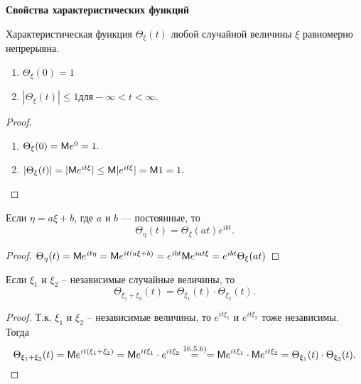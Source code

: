 \textbf{Свойства характеристических функций}

\begin{theorem}
\label{th:24.4}
	Характеристическая функция $\Theta_{\xi} (t)$ любой случайной величины $\xi$ равномерно непрерывна.
\end{theorem}

\begin{lemma}\-
\label{lemma:24.5}

\begin{enumerate}
	\item $\Theta_{\xi} (0) = 1$
	\item $|\Theta_{\xi} (t)| \leq 1 \text{для} −\infty < t < \infty$.
\end{enumerate}
\end{lemma}

\begin{proof}\-

\begin{enumerate}
	\item $\Theta_{\xi} (0) = \mathsf{M} e^0 = 1.$
	\item $|\Theta_{\xi} (t)| = |\mathsf{M} e^{it\xi} | \leq \mathsf{M}|e^{it\xi} | = \mathsf{M} 1 = 1.$
\end{enumerate}
\end{proof}

 \begin{lemma}
 \label{lemma:24.6}
  	Если $\eta = a\xi + b$, где $a$ и $b$ — постоянные, то
$$\Theta_{\eta} (t) = \Theta_{\xi} (at) e^{ibt}.$$
  \end{lemma} 

  \begin{proof}
  	$\Theta_{\eta} (t) = \mathsf{M} e^{it\eta} = \mathsf{M} e^{it(a\xi+b)} = e^{ibt} \mathsf{M} e^{iat\xi} = e^{ibt} \Theta_{\xi} (at)$
  \end{proof}

\begin{lemma}
\label{lemma:24.7}
 Если $\xi_1$ и $\xi_2$ -- независимые случайные величины, то
$$\Theta_{\xi_1 +\xi_2} (t) = \Theta_{\xi_1} (t) \cdot \Theta_{\xi_2} (t).$$
 \end{lemma} 

\begin{proof}
Т.к. $\xi_1$ и $\xi_2$ -- независимые величины, то $e^{it\xi_1}$ и $e^{it\xi_2}$ тоже независимы. Тогда
$$\Theta_{\xi_1 +\xi_2} (t) = \mathsf{M} e^{it(\xi_1 +\xi_2 )} = \mathsf{M} e^{it\xi_1} \cdot e^{it\xi_2} \stackrel{16.5.6)}{=}
= \mathsf{M} e^{it\xi_1} \cdot \mathsf{M} e^{it\xi_2} = \Theta_{\xi_1} (t) \cdot \Theta_{\xi_2} (t).$$
\end{proof}

